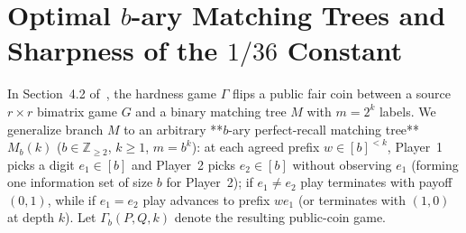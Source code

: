 \documentclass[11pt,a4paper]{article}
\theoremstyle{remark}
\newcommand{\Z}{\mathbb{Z}}
\begin{document}
\section{Optimal \texorpdfstring{$b$}{b}-ary Matching Trees and Sharpness of the \texorpdfstring{$1/36$}{1/36} Constant}\label{sec:bary}

In Section~4.2 of~\cite{CHPS2026}, the hardness game $\Gamma$ flips a public fair coin between a source $r{\times}r$ bimatrix game $G$ and a binary matching tree $M$ with $m = 2^k$ labels. We generalize branch $M$ to an arbitrary **$b$-ary perfect-recall matching tree** $M_b(k)$ ($b \in \Z_{\ge 2}$, $k \ge 1$, $m = b^k$): at each agreed prefix $w \in [b]^{<k}$, Player~1 picks a digit $e_1 \in [b]$ and Player~2 picks $e_2 \in [b]$ without observing $e_1$ (forming one information set of size $b$ for Player~2); if $e_1 \neq e_2$ play terminates with payoff $(0,1)$, while if $e_1 = e_2$ play advances to prefix $w e_1$ (or terminates with $(1,0)$ at depth $k$). Let $\Gamma_b(P,Q,k)$ denote the resulting public-coin game.
\end{document}
